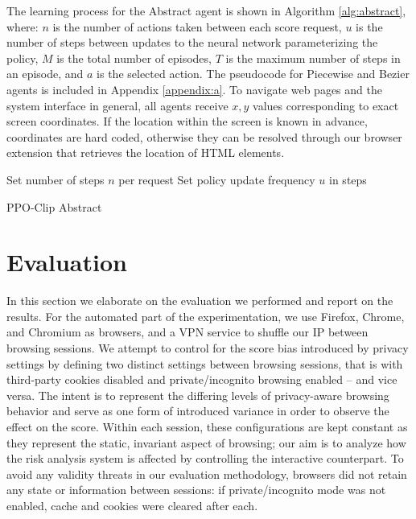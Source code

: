 The learning process for the Abstract agent is shown in Algorithm \ref{alg:abstract}, where: $n$ is the number of actions taken between each score request, $u$ is the number of steps between updates to the neural network parameterizing the policy, $M$ is the total number of episodes, $T$ is the maximum number of steps in an episode, and $a$ is the selected action.
The pseudocode for Piecewise and Bezier agents is included in Appendix \ref{appendix:a}.
To navigate web pages and the system interface in general, all agents receive $x,y$ values corresponding to exact screen coordinates.
If the location within the screen is known in advance, coordinates are hard coded, otherwise they can be resolved through our browser extension that retrieves the location of HTML elements.

\begin{algorithm}
\SetAlgoLined
 Set number of steps $n$ per request\;
 Set policy update frequency $u$ in steps\;
 \caption{PPO-Clip Abstract}
 \label{alg:abstract}
\end{algorithm}

\section{Evaluation}
\label{sec:evaluationrere}

In this section we elaborate on the evaluation we performed and report on the results.
For the automated part of the experimentation, we use Firefox, Chrome, and Chromium as browsers, and a VPN service to shuffle our IP between browsing sessions.
We attempt to control for the score bias introduced by privacy settings by defining two distinct settings between browsing sessions, that is with third-party cookies disabled and private/incognito browsing enabled -- and vice versa.
The intent is to represent the differing levels of privacy-aware browsing behavior and serve as one form of introduced variance in order to observe the effect on the score.
Within each session, these configurations are kept constant as they represent the static, invariant aspect of browsing; our aim is to analyze how the risk analysis system is affected by controlling the interactive counterpart.
To avoid any validity threats in our evaluation methodology, browsers did not retain any state or information between sessions: if private/incognito mode was not enabled, cache and cookies were cleared after each.

